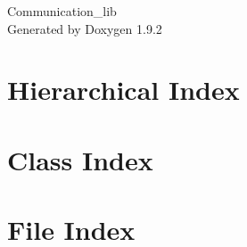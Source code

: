 \documentclass[twoside]{book}
\newcommand{\+}{\discretionary{\mbox{\scriptsize$\hookleftarrow$}}{}{}}
\newcommand{\clearemptydoublepage}{%
    \newpage{\pagestyle{empty}\cleardoublepage}%
  }
\begin{document}
  \raggedbottom
    \hypersetup{pageanchor=false,
                bookmarksnumbered=true,
                pdfencoding=unicode
               }
  \begin{titlepage}
  \vspace*{7cm}
  \begin{center}%
  {\Large Communication\+\_\+lib}\\
  \vspace*{1cm}
  {\large Generated by Doxygen 1.9.2}\\
  \end{center}
  \end{titlepage}
  \clearemptydoublepage
  \tableofcontents
  \clearemptydoublepage
  \hypersetup{pageanchor=true}
\chapter{Hierarchical Index}

\chapter{Class Index}

\chapter{File Index}

\end{document}
